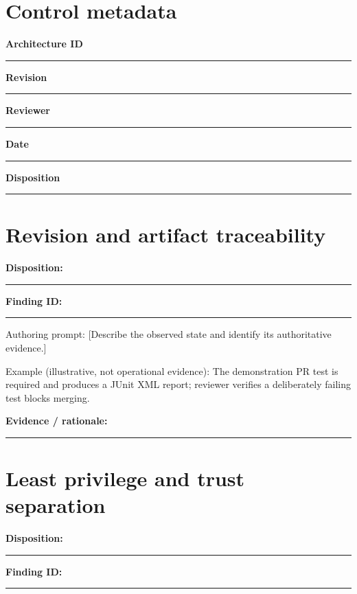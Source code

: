 \documentclass[11pt,letterpaper]{article}
\begin{document}
\makedoctitle\makedocsummary
\section{Control metadata}
\noindent\textbf{Architecture ID}\par\nobreak\vspace{6pt}\noindent\rule{0.93\linewidth}{0.4pt}\par\vspace{14pt}
\noindent\textbf{Revision}\par\nobreak\vspace{6pt}\noindent\rule{0.93\linewidth}{0.4pt}\par\vspace{14pt}
\noindent\textbf{Reviewer}\par\nobreak\vspace{6pt}\noindent\rule{0.93\linewidth}{0.4pt}\par\vspace{14pt}
\noindent\textbf{Date}\par\nobreak\vspace{6pt}\noindent\rule{0.93\linewidth}{0.4pt}\par\vspace{14pt}
\noindent\textbf{Disposition}\par\nobreak\vspace{6pt}\noindent\rule{0.93\linewidth}{0.4pt}\par\vspace{14pt}
\section{Revision and artifact traceability}
\noindent\textbf{Disposition:}\rule{2.5cm}{0.4pt}\quad\textbf{Finding ID:}\rule{4cm}{0.4pt}

Authoring prompt: [Describe the observed state and identify its authoritative evidence.]

Example (illustrative, not operational evidence): The demonstration PR test is required and produces a JUnit XML report; reviewer verifies a deliberately failing test blocks merging.

\noindent\textbf{Evidence / rationale:}\par\nobreak\vspace{8pt}\noindent\rule{0.93\linewidth}{0.4pt}\par\vspace{14pt}
\section{Least privilege and trust separation}
\noindent\textbf{Disposition:}\rule{2.5cm}{0.4pt}\quad\textbf{Finding ID:}\rule{4cm}{0.4pt}
\end{document}
